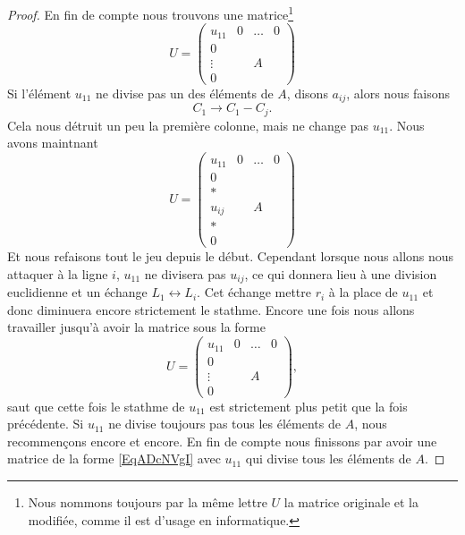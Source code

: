 \begin{proof}
    En fin de compte nous trouvons une matrice\footnote{Nous nommons toujours par la même lettre \( U\) la matrice originale et la modifiée, comme il est d'usage en informatique.}
    \begin{equation}
        U=\begin{pmatrix}
            u_{11}   &   0    &   \ldots    &   0    \\
             0   &       &       &       \\
             \vdots   &       &   A    &       \\ 
             0   &       &       &        
         \end{pmatrix}
    \end{equation}
    Si l'élément \( u_{11}\) ne divise pas un des éléments de \( A\), disons \( a_{ij}\), alors nous faisons 
    \begin{equation}
        C_1\to C_1-C_j.
    \end{equation}
    Cela nous détruit un peu la première colonne, mais ne change pas \( u_{11}\). Nous avons maintnant
    \begin{equation}
        U=\begin{pmatrix}
            u_{11}   &   0    &   \ldots    &   0    \\
             0   &       &       &       \\
             *   &       &       &       \\ 
             u_{ij}   &       &   A    &       \\ 
             *   &       &       &       \\ 
             0   &       &       &        
         \end{pmatrix}
    \end{equation}
    Et nous refaisons tout le jeu depuis le début. Cependant lorsque nous allons nous attaquer à la ligne \( i\), \( u_{11}\) ne divisera pas \( u_{ij}\), ce qui donnera lieu à une division euclidienne et un échange \( L_1\leftrightarrow L_i\). Cet échange mettre \( r_i\) à la place de \( u_{11}\) et donc diminuera encore strictement le stathme. Encore une fois nous allons travailler jusqu'à avoir la matrice sous la forme
    \begin{equation}    \label{EqADcNVgI}
        U=\begin{pmatrix}
            u_{11}   &   0    &   \ldots    &   0    \\
             0   &       &       &       \\
             \vdots   &       &   A    &       \\ 
             0   &       &       &        
         \end{pmatrix},
    \end{equation}
    saut que cette fois le stathme de \( u_{11}\) est strictement plus petit que la fois précédente. Si \( u_{11}\) ne divise toujours pas tous les éléments de \( A\), nous recommençons encore et encore. En fin de compte nous finissons par avoir une matrice de la forme \eqref{EqADcNVgI} avec \( u_{11}\) qui divise tous les éléments de \( A\).


\end{proof}
